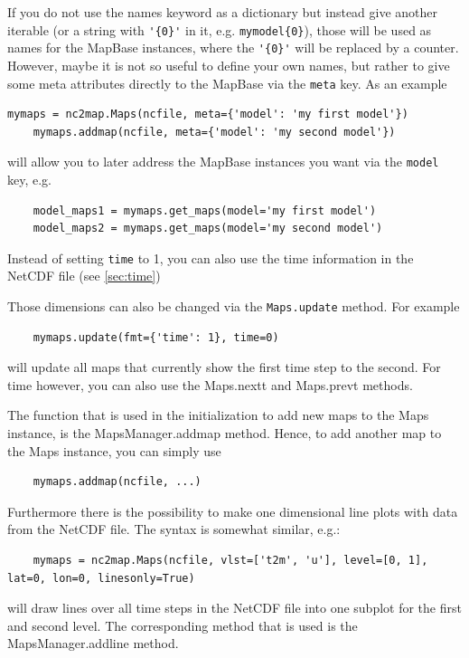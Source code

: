 If you do not use the \glspl{name} keyword as a dictionary but instead give another iterable (or a string with \lstinline|'{0}'| in it, e.g. \lstinline|mymodel{0}|), those will be used as names for the \gls{MapBase} instances, where the \lstinline|'{0}'| will be replaced by a counter. However, maybe it is not so useful to define your own names, but rather to give some meta attributes directly to the \gls{MapBase} via the \lstinline|meta| key. As an example
\begin{lstlisting}[label={lst:own_meta}, caption={Assigning your own meta informations}]
	mymaps = nc2map.Maps(ncfile, meta={'model': 'my first model'})
	mymaps.addmap(ncfile, meta={'model': 'my second model'})
\end{lstlisting}
will allow you to later address the \gls{MapBase} instances you want via the \lstinline|model| key, e.g.
\begin{lstlisting}
	model_maps1 = mymaps.get_maps(model='my first model')
	model_maps2 = mymaps.get_maps(model='my second model')
\end{lstlisting}
Instead of setting \lstinline|time| to 1, you can also use the time information in the NetCDF file (see \autoref{sec:time})

Those dimensions can also be changed via the \lstinline|Maps.update| method. For example
\begin{lstlisting}
	mymaps.update(fmt={'time': 1}, time=0)
\end{lstlisting}
will update all maps that currently show the first time step to the second. For time however, you can also use the \gls{Maps.nextt} and \gls{Maps.prevt} methods.

The function that is used in the initialization to add new maps to the \gls{Maps} instance, is the \gls{MapsManager.addmap} method. Hence, to add another map to the \gls{Maps} instance, you can simply use
\begin{lstlisting}
    mymaps.addmap(ncfile, ...)
\end{lstlisting}
Furthermore there is the possibility to make one dimensional line plots with data from the NetCDF file. The syntax is somewhat similar, e.g.:
\begin{lstlisting}
	mymaps = nc2map.Maps(ncfile, vlst=['t2m', 'u'], level=[0, 1], lat=0, lon=0, linesonly=True)
\end{lstlisting}
will draw lines over all time steps in the NetCDF file into one subplot for the first and second level. The corresponding method that is used is the \gls{MapsManager.addline} method.

